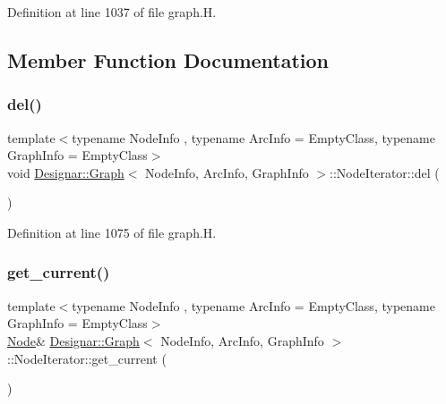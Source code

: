 Definition at line 1037 of file graph.\+H.



\subsection{Member Function Documentation}
\mbox{\label{class_designar_1_1_graph_1_1_node_iterator_a8ff7d2de6b10d3fd60774db675340259}} 
\subsubsection{\texorpdfstring{del()}{del()}}
{\footnotesize\ttfamily template$<$typename Node\+Info , typename Arc\+Info  = Empty\+Class, typename Graph\+Info  = Empty\+Class$>$ \\
void \hyperlink{class_designar_1_1_graph}{Designar\+::\+Graph}$<$ Node\+Info, Arc\+Info, Graph\+Info $>$\+::Node\+Iterator\+::del (\begin{DoxyParamCaption}{ }\end{DoxyParamCaption})\hspace{0.3cm}{\ttfamily [inline]}}



Definition at line 1075 of file graph.\+H.

\mbox{\label{class_designar_1_1_graph_1_1_node_iterator_a79268477058bf2d213dc11581c12a125}} 
\subsubsection{\texorpdfstring{get\+\_\+current()}{get\_current()}\hspace{0.1cm}{\footnotesize\ttfamily [1/2]}}
{\footnotesize\ttfamily template$<$typename Node\+Info , typename Arc\+Info  = Empty\+Class, typename Graph\+Info  = Empty\+Class$>$ \\
\hyperlink{class_designar_1_1_graph_a5dfc7dba9d092ac489c72e40390c37d0}{Node}\& \hyperlink{class_designar_1_1_graph}{Designar\+::\+Graph}$<$ Node\+Info, Arc\+Info, Graph\+Info $>$\+::Node\+Iterator\+::get\+\_\+current (\begin{DoxyParamCaption}{ }\end{DoxyParamCaption})\hspace{0.3cm}{\ttfamily [inline]}}




